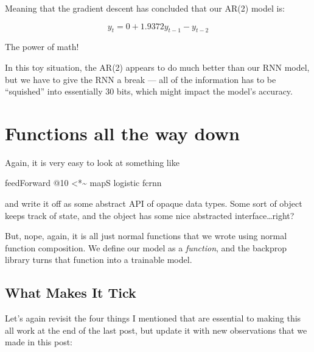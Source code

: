 \documentclass[]{article}
\newenvironment{Shaded}{}{}
\newcommand{\DecValTok}[1]{\textcolor[rgb]{0.25,0.63,0.44}{#1}}
\newcommand{\NormalTok}[1]{#1}
\newcommand{\OperatorTok}[1]{\textcolor[rgb]{0.40,0.40,0.40}{#1}}
\begin{document}
Meaning that the gradient descent has concluded that our AR(2) model is:

\[
y_t = 0 + 1.9372 y_{t - 1} - y_{t - 2}
\]

The power of math!

In this toy situation, the AR(2) appears to do much better than our RNN model,
but we have to give the RNN a break --- all of the information has to be
``squished'' into essentially 30 bits, which might impact the model's accuracy.

\hypertarget{functions-all-the-way-down}{%
\section{Functions all the way down}\label{functions-all-the-way-down}}

Again, it is very easy to look at something like

\begin{Shaded}
\begin{Highlighting}[]
\NormalTok{feedForward }\OperatorTok{@}\DecValTok{10} \OperatorTok{<*\textasciitilde{}}\NormalTok{ mapS logistic fcrnn}
\end{Highlighting}
\end{Shaded}

and write it off as some abstract API of opaque data types. Some sort of object
keeps track of state, and the object has some nice abstracted
interface\ldots right?

But, nope, again, it is all just normal functions that we wrote using normal
function composition. We define our model as a \emph{function}, and the backprop
library turns that function into a trainable model.

\hypertarget{what-makes-it-tick}{%
\subsection{What Makes It Tick}\label{what-makes-it-tick}}

Let's again revisit the four things I mentioned that are essential to making
this all work at the end of the last post, but update it with new observations
that we made in this post:
\end{document}
